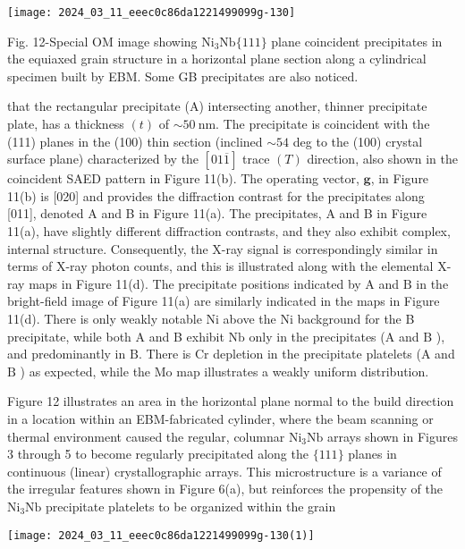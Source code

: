 \documentclass[10pt]{article}
\begin{document}
\begin{center}
\texttt{[image: 2024\_03\_11\_eeec0c86da1221499099g-130]}
\end{center}

Fig. 12-Special OM image showing $\mathrm{Ni}_{3} \mathrm{Nb}\{111\}$ plane coincident precipitates in the equiaxed grain structure in a horizontal plane section along a cylindrical specimen built by EBM. Some GB precipitates are also noticed.

that the rectangular precipitate (A) intersecting another, thinner precipitate plate, has a thickness $(t)$ of $\sim 50 \mathrm{~nm}$. The precipitate is coincident with the (111) planes in the (100) thin section (inclined $\sim 54$ deg to the (100) crystal surface plane) characterized by the $[01 \overline{1}]$ trace $(T)$ direction, also shown in the coincident SAED pattern in Figure 11(b). The operating vector, $\mathbf{g}$, in Figure 11(b) is [020] and provides the diffraction contrast for the precipitates along [011], denoted A and B in Figure 11(a). The precipitates, A and B in Figure 11(a), have slightly different diffraction contrasts, and they also exhibit complex, internal structure. Consequently, the X-ray signal is correspondingly similar in terms of X-ray photon counts, and this is illustrated along with the elemental X-ray maps in Figure 11(d). The precipitate positions indicated by $\mathrm{A}$ and $\mathrm{B}$ in the bright-field image of Figure 11(a) are similarly indicated in the maps in Figure 11(d). There is only weakly notable Ni above the $\mathrm{Ni}$ background for the B precipitate, while both A and B exhibit $\mathrm{Nb}$ only in the precipitates (A and $\mathrm{B}$ ), and predominantly in $\mathrm{B}$. There is $\mathrm{Cr}$ depletion in the precipitate platelets (A and $\mathrm{B}$ ) as expected, while the Mo map illustrates a weakly uniform distribution.

Figure 12 illustrates an area in the horizontal plane normal to the build direction in a location within an EBM-fabricated cylinder, where the beam scanning or thermal environment caused the regular, columnar $\mathrm{Ni}_{3} \mathrm{Nb}$ arrays shown in Figures 3 through 5 to become regularly precipitated along the $\{111\}$ planes in continuous (linear) crystallographic arrays. This microstructure is a variance of the irregular features shown in Figure 6(a), but reinforces the propensity of the $\mathrm{Ni}_{3} \mathrm{Nb}$ precipitate platelets to be organized within the grain

\begin{center}
\texttt{[image: 2024\_03\_11\_eeec0c86da1221499099g-130(1)]}
\end{center}
\end{document}

